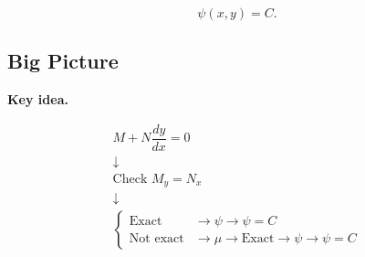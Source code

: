 \documentclass[11pt]{article}
\newenvironment{keyideabox}
    {\par\medskip\noindent\textbf{Key idea.}\par}
    {\par\medskip}
\begin{document}
\[
\boxed{\psi(x,y)=C}.
\]

\subsection{Big Picture}

\begin{keyideabox}

\[
\boxed{
\begin{array}{c}
M+N\dfrac{dy}{dx}=0
\\[0.5em]
\downarrow
\\[0.5em]
\text{Check }M_y=N_x
\\[0.5em]
\downarrow
\\[0.5em]
\begin{cases}
\text{Exact}
&
\longrightarrow
\psi
\longrightarrow
\psi=C
\\[0.7em]
\text{Not exact}
&
\longrightarrow
\mu
\longrightarrow
\text{Exact}
\longrightarrow
\psi
\longrightarrow
\psi=C
\end{cases}
\end{array}
}
\]

\end{keyideabox}

\end{document}
